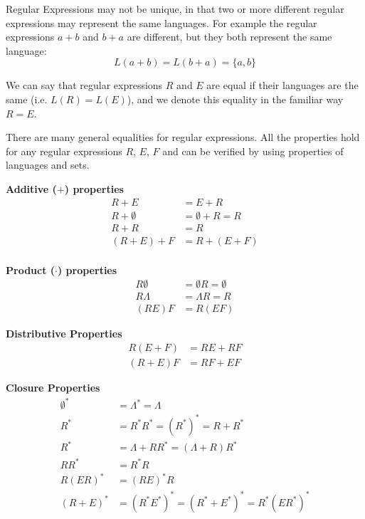 Regular Expressions may not be unique, in that two or more different regular expressions may represent the same languages. For example the regular expressions $a + b$ and $b + a$ are different, but they both represent the same language:
\[L(a + b) = L(b + a) = \{a, b\}\]

We can say that regular expressions $R$ and $E$ are equal if their languages are the same (i.e. $L(R) = L(E)$), and we denote this equality in the familiar way $R=E$. 

There are many general equalities for regular expressions. All the properties hold for any regular expressions $R$, $E$, $F$ and can be verified by using properties of languages and sets.

\begin{multicols}{2}
\textbf{Additive ($+$) properties}
\begin{align*}
R + E &= E + R\\
R + \emptyset &= \emptyset + R = R\\
R + R &= R\\
(R+E) + F &= R + (E + F)\\
\end{align*}

\textbf{Product ($\cdot$) properties}
\begin{align*}
R\emptyset &= \emptyset R = \emptyset\\
R \Lambda &= \Lambda R = R\\
(RE)F &= R(EF)
\end{align*}
\vfill\null

\columnbreak

\textbf{Distributive Properties}
\begin{align*}
R(E+F) &= RE + RF\\
(R+E)F &= RF+EF
\end{align*}

\textbf{Closure Properties}
\begin{align*}
\emptyset^* &= \Lambda^* = \Lambda\\
R^* &= R^* R^* = (R^*)^* = R+R^*\\
R^* &= \Lambda + RR^* = (\Lambda + R)R^*\\
RR^* &= R^*R\\
R(ER)^* &= (RE)^*R\\
(R+E)^* &= (R^*E^*)^* = (R^*+E^*)^* = R^*(ER^*)^*
\end{align*}

\end{multicols}

